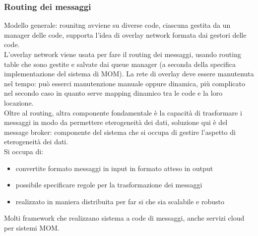 \documentclass[16px]{article}
\begin{document}
\subsubsection{Routing dei messaggi}
Modello generale: rounitng avviene su diverse code, ciascuna gestita da un manager delle code, supporta l'idea di overlay network formata dai gestori delle code.\\ L'overlay network viene usata per fare il routing dei messaggi, usando routing table che sono gestite e salvate dai queue manager (a seconda della specifica implementazione del sistema di MOM). La rete di overlay deve essere manutenuta nel tempo: può esserci manutenzione manuale oppure dinamica, più complicato nel secondo caso in quanto serve mapping dinamico tra le code e la loro locazione.\\ Oltre al routing, altra componente fondamentale è la capacità di trasformare i messaggi in modo da permettere eterogeneità dei dati, soluzione qui è del message broker: componente del sistema che si occupa di gestire l'aspetto di eterogeneità dei dati.\\ Si occupa di:
\begin{itemize}
\item convertite formato messaggi in input in formato atteso in output
\item possibile specificare regole per la trasformazione dei messaggi
\item realizzato in maniera distribuita per far si che sia scalabile e robusto
\end{itemize}
Molti framework che realizzano sistema a code di messaggi, anche servizi cloud per sistemi MOM.
\end{document}
